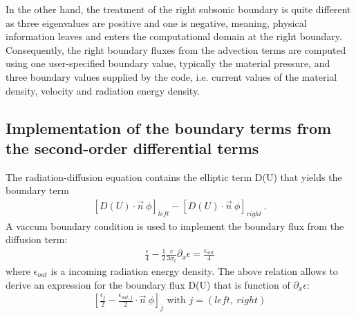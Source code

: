 In the other hand, the treatment of the right subsonic boundary is quite different as three eigenvalues are positive and one is negative, meaning, physical information leaves and enters the computational domain at the right boundary. Consequently, the right boundary fluxes from the advection terms are computed using one user-specified boundary value, typically the material pressure, and three boundary values supplied by the code, i.e. current values of the material density, velocity and radiation energy density. 
%
\subsection{Implementation of the boundary terms from the second-order differential terms}
%
The radiation-diffusion equation contains the elliptic term D(U) that yields the boundary term 
%
\begin{eqnarray}
\left[D(U)\cdot \vec{n} \ \phi \right]_{left} - \left[D(U)\cdot \vec{n} \ \phi \right]_{right} \, .
\end{eqnarray}
%
A vaccum boundary condition is used to implement the boundary flux from the diffusion term:
%
\begin{eqnarray}
\frac{\epsilon}{4} - \frac{1}{2}\frac{c}{3 \sigma_t} \partial_x \epsilon = \frac{\epsilon_{out}}{4}
\end{eqnarray}
%
where $\epsilon_{out}$ is a incoming radiation energy density. The above relation allows to derive an expression for the boundary flux D(U) that is function of $\partial_x \epsilon$:
%
\begin{eqnarray}
\left[ \frac{\epsilon_j}{2} - \frac{\epsilon_{out,j}}{2} \cdot \vec{n} \ \phi \right]_{j} \text{ with } j = \left( left, \ right \right)
\end{eqnarray}
% 

